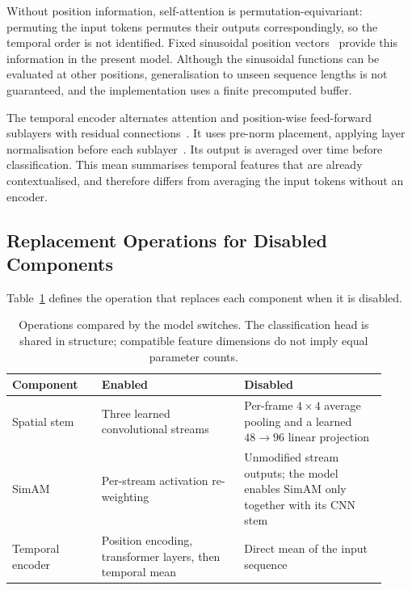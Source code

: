 Without position information, self-attention is permutation-equivariant: permuting the input tokens permutes their outputs correspondingly, so the temporal order is not identified. Fixed sinusoidal position vectors~\cite{vaswani2017} provide this information in the present model. Although the sinusoidal functions can be evaluated at other positions, generalisation to unseen sequence lengths is not guaranteed, and the implementation uses a finite precomputed buffer.

The temporal encoder alternates attention and position-wise feed-forward sublayers with residual connections~\cite{he2016}. It uses pre-norm placement, applying layer normalisation before each sublayer~\cite{xiong2020}. Its output is averaged over time before classification. This mean summarises temporal features that are already contextualised, and therefore differs from averaging the input tokens without an encoder.

\subsection{Replacement Operations for Disabled Components}
\label{sec:fallbacks}

Table~\ref{tab:ch2-component-controls} defines the operation that replaces each component when it is disabled.

\begin{table}[htbp]
    \centering
    \small
    \begin{tabular}{@{}p{0.22\linewidth} p{0.35\linewidth} p{0.35\linewidth}@{}}
        \hline
        \textbf{Component} & \textbf{Enabled} & \textbf{Disabled} \\
        \hline
        Spatial stem & Three learned convolutional streams & Per-frame $4\times4$ average pooling and a learned $48\rightarrow96$ linear projection \\
        SimAM & Per-stream activation re-weighting & Unmodified stream outputs; the model enables SimAM only together with its CNN stem \\
        Temporal encoder & Position encoding, transformer layers, then temporal mean & Direct mean of the input sequence \\
        \hline
    \end{tabular}
    \caption[Enabled components and their controls]{Operations compared by the model switches. The classification head is shared in structure; compatible feature dimensions do not imply equal parameter counts.}
    \label{tab:ch2-component-controls}
\end{table}

